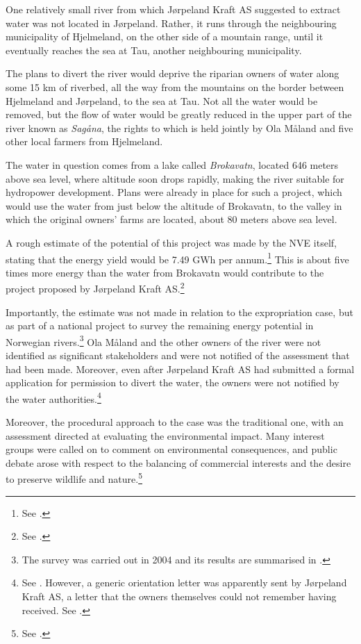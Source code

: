 One relatively small river from which Jørpeland Kraft AS suggested to extract water was not located in Jørpeland. Rather, it runs through the neighbouring municipality of Hjelmeland, on the other side of a mountain range, until it eventually reaches the sea at Tau, another neighbouring municipality. 

The plans to divert the river would deprive the riparian owners of water along some 15 km of riverbed, all the way from the mountains on the border between Hjelmeland and Jørpeland, to the sea at Tau. Not all the water would be removed, but the flow of water would be greatly reduced in the upper part of the river known as {\it Sagåna}, the rights to which is held jointly by Ola Måland and five other local farmers from Hjelmeland.

The water in question comes from a lake called \emph{Brokavatn}, located 646 meters above sea level, where altitude soon drops rapidly, making the river suitable for hydropower development. Plans were already in place for such a project, which would use the water from just below the altitude of Brokavatn, to the valley in which the original owners' farms are located, about 80 meters above sea level. 

A rough estimate of the potential of this project was made by the NVE itself, stating that the energy yield would be 7.49 GWh per annum.\footnote{See \cite[16]{jorpeland09}.} This is about five times more energy than the water from Brokavatn would contribute to the project proposed by Jørpeland Kraft AS.\footnote{See \cite[19]{jorpeland09}.}

Importantly, the estimate was not made in relation to the expropriation case, but as part of a national project to survey the remaining energy potential in Norwegian rivers.\footnote{The survey was carried out in 2004 and its results are summarised in \cite{jensen04}.} Ola Måland and the other owners of the river were not identified as significant stakeholders and were not notified of the assessment that had been made. Moreover, even after Jørpeland Kraft AS had submitted a formal application for permission to divert the water, the owners were not notified by the water authorities.\footnote{See \cite[16]{jorpeland09}. However, a generic orientation letter was apparently sent by Jørpeland Kraft AS, a letter that the owners themselves could not remember having received. See \cite[5|8]{jorpeland11a}.}

Moreover, the procedural approach to the case was the traditional one, with an assessment directed at evaluating the environmental impact. Many interest groups were called on to comment on environmental consequences, and public debate arose with respect to the balancing of commercial interests and the desire to preserve wildlife and nature.\footnote{See \cite[19]{jorpeland09}.}

